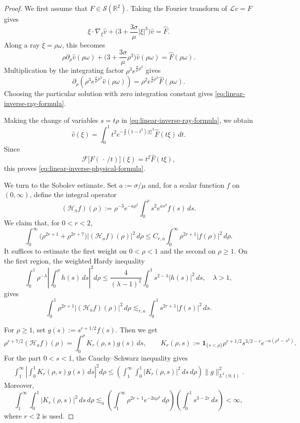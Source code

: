 \documentclass[12pt]{amsart}
\theoremstyle{remark}
\theoremstyle{definition}
\numberwithin{equation}{section}
\newcommand{\R}{\mathbb{R}}
\begin{document}
\begin{proof}
We first assume that \(F\in\mathcal S(\R^2)\).
Taking the Fourier transform of \(\mathcal Lv=F\) gives
\begin{equation*}
 \xi\cdot\nabla_\xi\widehat v + \bigl(3+\frac{3\sigma}{\mu}|\xi|^3\bigr)\widehat v = \widehat F.
\end{equation*}
Along a ray \(\xi=\rho\omega\), this becomes
\[
 \rho\partial_\rho\widehat v(\rho\omega) + \bigl(3+\frac{3\sigma}{\mu}\rho^3\bigr)\widehat v(\rho\omega) = \widehat F(\rho\omega).
\]
Multiplication by the integrating factor \(\rho^3e^{\frac{\sigma}{\mu}\rho^3}\) gives
\[
 \partial_\rho \left( \rho^3e^{\frac{\sigma}{\mu}\rho^3}\widehat v(\rho\omega) \right) = \rho^2e^{\frac{\sigma}{\mu}\rho^3}\widehat F(\rho\omega).
\]
Choosing the particular solution with zero integration constant gives \eqref{eq:linear-inverse-ray-formula}.

Making the change of variables \(s=t\rho\) in \eqref{eq:linear-inverse-ray-formula}, we obtain
\[
 \widehat v(\xi) = \int_0^1 t^2e^{-\frac{\sigma}{\mu}(1-t^3)|\xi|^3} \widehat F(t\xi)\,dt.
\]
Since
\[
 \mathcal F\bigl[F(\,\cdot\,/t)\bigr](\xi) = t^2\widehat F(t\xi),
\]
this proves \eqref{eq:linear-inverse-physical-formula}.

We turn to the Sobolev estimate. Set \(a:=\sigma/\mu\) and, for a
scalar function \(f\) on \((0,\infty)\), define the integral operator
\[
 (\mathcal H_af)(\rho):=\rho^{-3}e^{-a\rho^3}
 \int_0^\rho s^2e^{as^3}f(s)\,ds.
\]
We claim that, for \(0<r<2\),
\begin{equation}
\label{eq:weighted-Hardy-linear}
 \int_0^\infty \bigl(\rho^{2r+1}+\rho^{2r+7}\bigr)
 |(\mathcal H_af)(\rho)|^2\,d\rho
 \leq C_{r,a}\int_0^\infty \rho^{2r+1}|f(\rho)|^2\,d\rho.
\end{equation}
It suffices to estimate the first weight on \(0<\rho<1\) and the second
on \(\rho\geq1\). On the first region, the weighted Hardy inequality
\[ 
\int_0^1 \rho^{-\lambda} \left| \int_0^\rho h(s)\,ds \right|^2d\rho \leq \frac{4}{(\lambda-1)^2} \int_0^1 s^{2-\lambda}|h(s)|^2\,ds,\quad \lambda>1,
\]
gives
\[
 \int_0^1\rho^{2r+1}|(\mathcal H_af)(\rho)|^2\,d\rho
 \lesssim_{r,a}\int_0^1s^{2r+1}|f(s)|^2\,ds.
\]

For \(\rho\geq1\), set \(g(s):=s^{r+1/2}f(s)\). 
Then we get
\[
 \rho^{r+7/2}(\mathcal H_af)(\rho)
 =\int_0^\rho K_r(\rho,s)g(s)\,ds,\qquad
 K_r(\rho,s):=\mathbf 1_{\{s<\rho\}}\rho^{r+1/2}s^{3/2-r}
 e^{-a(\rho^3-s^3)}.
\]
For the part \(0<s<1\), the Cauchy--Schwarz inequality gives
\begin{align*}
\int_1^\infty
 \left|
  \int_0^1K_r(\rho,s)g(s)\,ds
 \right|^2d\rho\leq
 \left(
  \int_1^\infty\int_0^1
  |K_r(\rho,s)|^2\,ds\,d\rho
 \right)
 \|g\|_{L^2(0,1)}^2.
\end{align*}
Moreover,
\[
 \int_1^\infty\int_0^1
 |K_r(\rho,s)|^2\,ds\,d\rho
 \lesssim_a
 \left(
  \int_1^\infty
  \rho^{2r+1}e^{-2a\rho^3}\,d\rho
 \right)
 \left(
  \int_0^1s^{3-2r}\,ds
 \right)
 <\infty,
\]
where \(r<2\) is used.


\end{proof}
\end{document}
